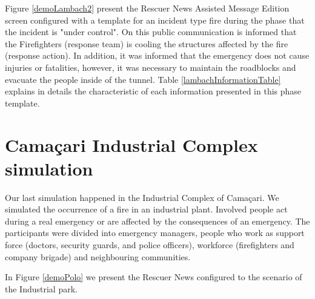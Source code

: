 Figure \ref{demoLambach2} present the Rescuer News Assisted Message Edition screen configured with a template for an incident type fire during the phase that the incident is "under control". On this public communication is informed that the Firefighters (response team) is cooling the structures affected by the fire (response action). In addition, it was informed that the emergency does not cause injuries or fatalities, however, it was necessary to maintain the roadblocks and evacuate the people inside of the tunnel. Table \ref{lambachInformationTable} explains in details the characteristic of each information presented in this phase template. 


\section{Cama\c{c}ari Industrial Complex simulation}

Our last simulation happened in the Industrial Complex of Cama\c{c}ari. We simulated the occurrence of a fire in an industrial plant. Involved people act during a real emergency or are affected by the consequences of an emergency. The participants were divided into emergency managers, people who work as support force (doctors, security guards, and police officers), workforce (firefighters and company brigade) and neighbouring communities. 

In Figure \ref{demoPolo} we present the Rescuer News configured to the scenario of the Industrial park. 

